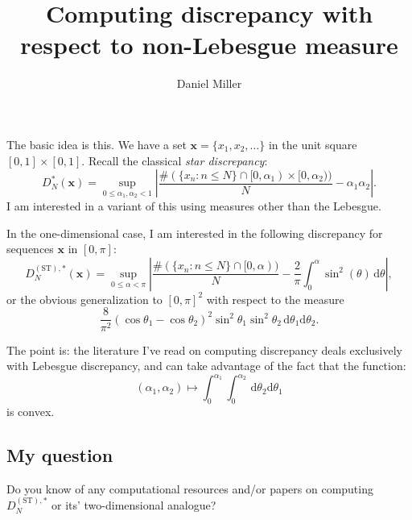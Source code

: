 \documentclass{article}
\title{Computing discrepancy with respect to non-Lebesgue measure}
\author{Daniel Miller}
\begin{document}
\maketitle

The basic idea is this. We have a set $\boldsymbol x = \{x_1,x_2,\dots\}$ in 
the unit square $[0,1]\times [0,1]$. Recall the classical \emph{star discrepancy}:
\[
	D_N^\ast(\boldsymbol x) = \sup_{0\leqslant \alpha_1,\alpha_2 < 1} \left| \frac{\#(\{x_n : n\leqslant N\}\cap [0,\alpha_1)\times [0,\alpha_2))}{N} - \alpha_1 \alpha_2\right| .
\]
I am interested in a variant of this using measures other than the Lebesgue. 

In the one-dimensional case, I am interested in the following discrepancy for 
sequences $\boldsymbol x$ in $[0,\pi]$:
\[
	D_N^{(\mathrm{ST}),\ast}(\boldsymbol x) = \sup_{0\leqslant \alpha < \pi} \left| \frac{\# (\{x_n : n\leqslant N\}\cap [0,\alpha))}{N} - \frac{2}{\pi}\int_0^\alpha \sin^2(\theta)\, \mathrm{d}\theta \right| ,
\]
or the obvious generalization to $[0,\pi]^2$ with respect to the measure
\[
	\frac{8}{\pi^2} (\cos \theta_1-\cos\theta_2)^2 \sin^2 \theta_1 \sin^2 \theta_2\, \mathrm{d} \theta_1 \mathrm{d} \theta_2 .
\]

The point is: the literature I've read on computing discrepancy deals 
exclusively with Lebesgue discrepancy, and can take advantage of the fact that 
the function:
\[
	(\alpha_1,\alpha_2) \mapsto \int_0^{\alpha_1} \int_0^{\alpha_2} \, \mathrm{d} \theta_2 \mathrm{d} \theta_1 
\]
is convex. 


\subsection*{My question}

Do you know of any computational resources and/or papers on computing 
$D_N^{(\mathrm{ST}),\ast}$ or its' two-dimensional analogue?
\end{document}
